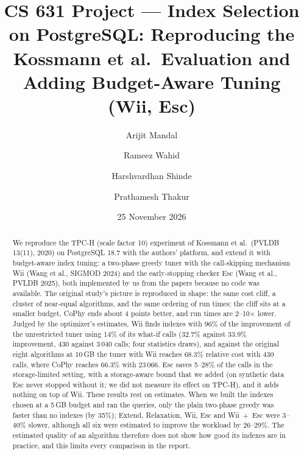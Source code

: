 \documentclass[11pt,a4paper]{article}
\title{CS 631 Project --- Index Selection on PostgreSQL: Reproducing the Kossmann et al.\ Evaluation and Adding Budget-Aware Tuning (Wii, Esc)}
\author{Arijit Mandal \and Rameez Wahid \and Harshvardhan Shinde \and Prathamesh Thakur}
\date{25 November 2026}
\begin{document}
\maketitle

\begin{abstract}
We reproduce the TPC-H (scale factor 10) experiment of Kossmann et al.\ (PVLDB 13(11), 2020) on PostgreSQL 18.7 with the authors' platform, and extend it with budget-aware index tuning: a two-phase greedy tuner with the call-skipping mechanism Wii (Wang et al., SIGMOD 2024) and the early-stopping checker Esc (Wang et al., PVLDB 2025), both implemented by us from the papers because no code was available. The original study's picture is reproduced in shape: the same cost cliff, a cluster of near-equal algorithms, and the same ordering of run times; the cliff sits at a smaller budget, CoPhy ends about 4 points better, and run times are 2--10$\times$ lower. Judged by the optimizer's estimates, Wii finds indexes with 96\% of the improvement of the unrestricted tuner using 14\% of its what-if calls (32.7\% against 33.9\% improvement, 430 against 3\,040 calls; four statistics draws), and against the original eight algorithms at 10\,GB the tuner with Wii reaches 68.3\% relative cost with 430 calls, where CoPhy reaches 66.3\% with 23\,066. Esc saves 5--28\% of the calls in the storage-limited setting, with a storage-aware bound that we added (on synthetic data Esc never stopped without it; we did not measure its effect on TPC-H), and it adds nothing on top of Wii. These results rest on estimates. When we built the indexes chosen at a 5\,GB budget and ran the queries, only the plain two-phase greedy was faster than no indexes (by 35\%); Extend, Relaxation, Wii, Esc and Wii~+~Esc were 3--40\% slower, although all six were estimated to improve the workload by 26--29\%. The estimated quality of an algorithm therefore does not show how good its indexes are in practice, and this limits every comparison in the report.
\end{abstract}
\end{document}
